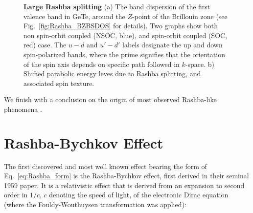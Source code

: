 \begin{figure}[h]
	\begin{subfigure}[b]{0.49\textwidth}
	\caption{}
	\end{subfigure}
	\begin{subfigure}[b]{0.49\textwidth}
	\caption{}
	\end{subfigure}
	\caption{\label{fig:Rashba_intro_dispersion}
		{\bf Large Rashba splitting} (a) The band dispersion of the first valence band in GeTe, around the $Z$-point of the Brillouin zone (see Fig.~\ref{fig:Rashba_BZBSDOS} for details). Two graphs show both non spin-orbit coupled (NSOC, blue), and spin-orbit coupled (SOC, red) case. The $u-d$ and $u'-d'$ labels designate the up and down spin-polarized bands, where the prime signifies that the orientation of the spin axis depends on specific path followed in $k$-space. b) Shifted parabolic energy leves due to Rashba splitting, and associated spin texture.}
\end{figure}

We finish with a conclusion on the origin of most observed Rashba-like phenomena .

\section{Rashba-Bychkov Effect}
The first discovered and most well known effect bearing the form of Eq.~\ref{eq:Rashba_form} is the Rashba-Bychkov effect, first derived in their seminal 1959 paper\cite{Rashba1959SymmetryAr}. It is a relativistic effect that is derived from an expansion to second order in $1/c$, $c$ denoting the speed of light, of the electronic Dirac equation (where the Fouldy-Wouthuysen transformation was applied):

